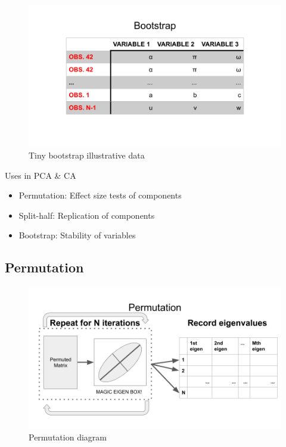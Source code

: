 \documentclass[
  ignorenonframetext,
]{beamer}
\providecommand{\tightlist}{%
  \setlength{\itemsep}{0pt}\setlength{\parskip}{0pt}}
\begin{document}
\begin{frame}

\begin{figure}
\centering
\includegraphics{../Images/bootstrap_data.png}
\caption{Tiny bootstrap illustrative data}
\end{figure}

\end{frame}

\begin{frame}{Uses in PCA \& CA}
\protect\hypertarget{uses-in-pca-ca}{}

\begin{itemize}[<+->]
\tightlist
\item
  Permutation: Effect size tests of components
\item
  Split-half: Replication of components
\item
  Bootstrap: Stability of variables
\end{itemize}

\end{frame}

\hypertarget{permutation}{%
\subsection{Permutation}\label{permutation}}

\begin{frame}

\begin{figure}
\centering
\includegraphics{../Images/permutation_diagram.png}
\caption{Permutation diagram}
\end{figure}

\end{frame}
\end{document}
